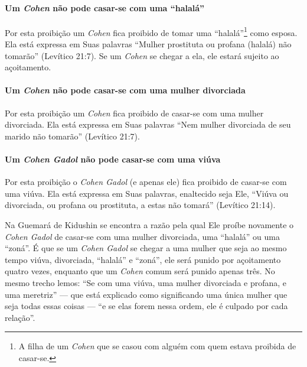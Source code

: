 \paragraph{Um \textit{Cohen} não pode casar-se com uma ``halalá''}

Por esta proibição um \textit{Cohen} fica proibido de tomar uma
``halalá''\footnote{A filha de um \textit{Cohen} que se casou com alguém com quem estava
  proibida de casar-se.} como esposa. Ela está expressa em Suas
palavras ``Mulher prostituta ou profana (halalá) não tomarão'' (Levítico
21:7). Se um \textit{Cohen} se chegar a ela, ele estará sujeito ao
açoitamento.

\paragraph{Um \textit{Cohen} não pode casar-se com uma mulher divorciada}

Por esta proibição um \textit{Cohen} fica proibido de casar-se com uma mulher
divorciada. Ela está expressa em Suas palavras ``Nem mulher divorciada
de seu marido não tomarão'' (Levítico 21:7).


\paragraph{Um \textit{Cohen Gadol} não pode casar-se com uma viúva}

Por esta proibição o \textit{Cohen Gadol} (e apenas ele) fica proibido de
casar-se com uma viúva. Ela está expressa em Suas palavras, enaltecido
seja Ele, ``Viúva ou divorciada, ou profana ou prostituta, a estas não
tomará'' (Levítico 21:14).

Na Guemará de Kidushin se encontra a razão pela qual Ele proíbe
novamente o \textit{Cohen Gadol} de casar-se com uma mulher divorciada, uma
``halalá'' ou uma ``zoná''. É que se um \textit{Cohen Gadol} se chegar a uma
mulher que seja ao mesmo tempo viúva, divorciada, ``halalá'' e ``zoná'',
ele será punido por açoitamento quatro vezes, enquanto que um \textit{Cohen}
comum será punido apenas três. No mesmo trecho lemos: ``Se com uma
viúva, uma mulher divorciada e profana, e uma meretriz'' --- que está
explicado como significando uma única mulher que seja todas essas
coisas --- ``e se elas forem nessa ordem, ele é culpado por cada
relação''.

